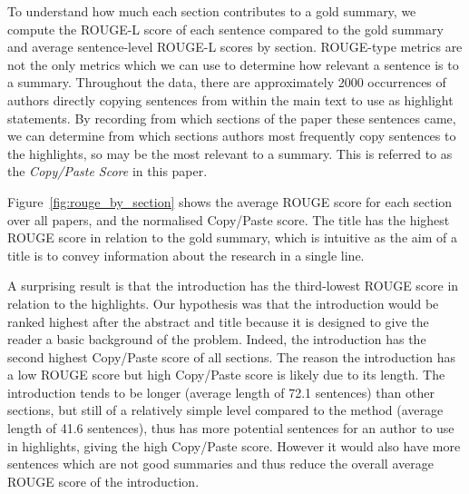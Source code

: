 \documentclass[11pt,a4paper]{article}
\begin{document}
To understand how much each section contributes to a gold summary, 
we compute the ROUGE-L score of each sentence compared to the gold summary and average sentence-level ROUGE-L scores by section. 
ROUGE-type metrics are not the only metrics which we can use to determine how relevant a sentence is to a summary. Throughout the data, there are approximately 2000 occurrences of authors directly copying sentences from within the main text to use as highlight statements. By recording from which sections of the paper these sentences came, we can determine from which sections authors most frequently copy sentences to the highlights, so may be the most relevant to a summary. This is referred to as the \textit{Copy/Paste Score} in this paper. 

Figure~\ref{fig:rouge_by_section} shows the average ROUGE score for each section over all papers, and the normalised Copy/Paste score. %
The title has the highest ROUGE score in relation to the gold summary, which is intuitive as the aim of a title is to convey information about the research in a single line. 

A surprising result is that the introduction has the third-lowest ROUGE score in relation to the highlights. Our hypothesis was that the introduction would be ranked highest after the abstract and title because it is designed to give the reader a basic background of the problem. Indeed, the introduction has the second highest Copy/Paste score of all sections. The reason the introduction has a low ROUGE score but high Copy/Paste score is likely due to its length. The introduction tends to be longer (average length of 72.1 sentences) than other sections, but still of a relatively simple level compared to the method (average length of 41.6 sentences), thus has more potential sentences for an author to use in highlights, giving the high Copy/Paste score. However it would also have more sentences which are not good summaries and thus reduce the overall average ROUGE score of the introduction. %
\end{document}
